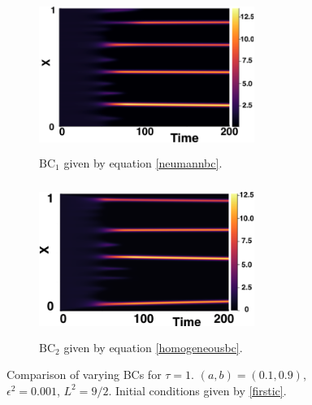 \begin{figure}[H]
    \centering
    \begin{subfigure}[t]{0.45\textwidth}
        \centering
        \includegraphics[width=7cm,height=5cm]{ic21.png}
        \caption{$\text{BC}_1$ given by equation \eqref{neumannbc}.}
        \label{}
    \end{subfigure}
    \hfill
    \begin{subfigure}[t]{0.45\textwidth}
        \centering
        \includegraphics[width=7cm,height=5cm]{bc1.png}
        \caption{$\text{BC}_2$ given by equation \eqref{homogeneousbc}.}
        \label{}
    \end{subfigure}
    \caption{Comparison of varying BCs for $\tau=1$. $(a,b)=(0.1,0.9)$, $\epsilon^2=0.001$, $L^2=9/2$. Initial conditions given by \eqref{firstic}.}
    \label{fig:bctau2}
\end{figure}

